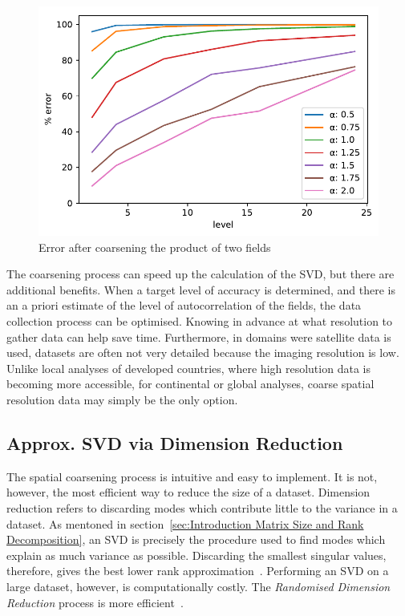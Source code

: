 \documentclass{acm_proc_article-sp}
\begin{document}
\begin{figure}[h]
\begin{center}
\includegraphics[width=0.8\columnwidth]{Results/plotProductSpatialTemporalFieldsViaCoarsening.pdf}
\caption[Error after coarsening product of fields]{Error after coarsening the product of two fields}
\label{fig:plotProductSpatialTemporalFieldsViaCoarsening}
\end{center}
\end{figure}
The coarsening process can speed up the calculation of the SVD, but there are additional benefits. When a target level of accuracy is determined, and there is an a priori estimate of the level of autocorrelation of the fields, the data collection process can be optimised. Knowing in advance at what resolution to gather data can help save time. Furthermore, in domains were satellite data is used, datasets are often not very detailed because the imaging resolution is low. Unlike local analyses of developed countries, where high resolution data is becoming more accessible, for continental or global analyses, coarse spatial resolution data may simply be the only option.

\subsection{Approx. SVD via Dimension Reduction}
\label{sec:Techniques Approximate SVD via Dimension Reduction}

The spatial coarsening process is intuitive and easy to implement. It is not, however, the most efficient way to reduce the size of a dataset. Dimension reduction refers to discarding modes which contribute little to the variance in a dataset. As mentoned in section~\ref{sec:Introduction Matrix Size and Rank Decomposition}, an SVD is precisely the procedure used to find modes which explain as much variance as possible. Discarding the smallest singular values, therefore, gives the best lower rank approximation~\cite{Eckart1936, Martinsson2016}. Performing an SVD on a large dataset, however, is computationally costly. The \textit{Randomised Dimension Reduction} process is more efficient~\cite{Halko2011, Li2016}.
\end{document}
